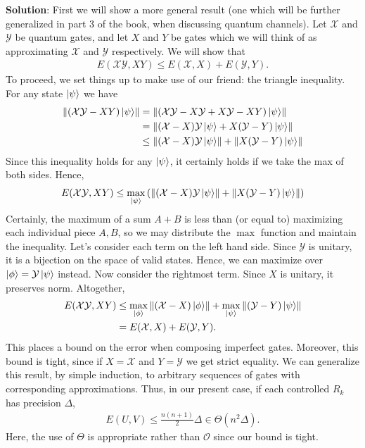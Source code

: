\documentclass{book}
\newcommand{\mc}[1]{\mathcal{#1}}
\begin{document}
    \textbf{Solution}: First we will show a more general result (one which will be further generalized in part 3 of the book, when discussing quantum channels). Let $\mc{X}$ and $\mc{Y}$ be quantum gates, and let $X$ and $Y$ be gates which we will think of as approximating $\mc{X}$ and $\mc{Y}$ respectively. We will show that
    \begin{align}
        E(\mc{XY},XY) \leq E(\mc{X},X) + E(\mc{Y},Y).
    \end{align}
    To proceed, we set things up to make use of our friend: the triangle inequality. For any state $\ket{\psi}$ we have
    \begin{align}
        \left\|(\mc{XY}-XY)\ket{\psi}\right\|&=\left\|(\mc{X}\mc{Y}-X\mc{Y}+X\mc{Y}-XY)\ket{\psi}\right\| \\
        &= \left\|(\mc{X}-X)\mc{Y}\ket{\psi}+X(\mc{Y}-Y)\ket{\psi}\right\| \\
        &\leq \left\|(\mc{X}-X)\mc{Y}\ket{\psi}\right\|+\left\|X(\mc{Y}-Y)\ket{\psi}\right\|
    \end{align}
    Since this inequality holds for any $\ket{\psi}$, it certainly holds if we take the max of both sides. Hence,
    \begin{align}
        E(\mc{XY},XY) \leq \max_{\ket{\psi}} \left(\left\|(\mc{X}-X)\mc{Y}\ket{\psi}\right\|+\left\|X(\mc{Y}-Y)\ket{\psi}\right\|\right)
    \end{align}
    Certainly, the maximum of a sum $A+B$ is less than (or equal to) maximizing each individual piece $A,B$, so we may distribute the $\max$ function and maintain the inequality. Let's consider each term on the left hand side. Since $\mc{Y}$ is unitary, it is a bijection on the space of valid states. Hence, we can maximize over $\ket{\phi} = \mc{Y}\ket{\psi}$ instead. Now consider the rightmost term. Since $X$ is unitary, it preserves norm. Altogether,
    \begin{align}
         E(\mc{XY},XY) &\leq \max_{\ket{\phi}}\left\|(\mc{X}-X)\ket{\phi}\right\| + \max_{\ket{\psi}}\left\|(\mc{Y}-Y)\ket{\psi}\right\|\\
         &= E(\mc{X},X) + E(\mc{Y},Y).
    \end{align}
    This places a bound on the error when composing imperfect gates. Moreover, this bound is tight, since if $X=\mc{X}$ and $Y=\mc{Y}$ we get strict equality. 
    We can generalize this result, by simple induction, to arbitrary sequences of gates with corresponding approximations. Thus, in our present case, if each controlled $R_k$ has precision $\Delta$, 
    \begin{align}
        E(U,V) \leq \frac{n(n+1)}{2}\Delta \in \Theta(n^2 \Delta).
    \end{align}
    Here, the use of $\Theta$ is appropriate rather than $\mc{O}$ since our bound is tight.
\end{document}
